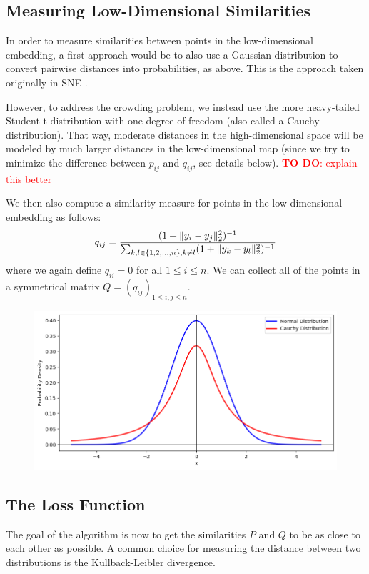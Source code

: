 \subsection{Measuring Low-Dimensional Similarities}
In order to measure similarities between points in the low-dimensional embedding, a first approach would be to also use a Gaussian distribution to convert pairwise distances into probabilities, as above. This is the approach taken originally in SNE \cite{Hinton02}.

However, to address the crowding problem, we instead use the more heavy-tailed Student t-distribution with one degree of freedom (also called a Cauchy distribution). That way, moderate distances in the high-dimensional space will be modeled by much larger distances in the low-dimensional map (since we try to minimize the difference between $p_{ij}$ and $q_{ij}$, see details below). 
\textcolor{red}{\textbf{TO DO}: explain this better}


We then also compute a similarity measure for points in the low-dimensional embedding as follows: 
\begin{equation}
    q_{ij} = \frac{(1+ \lVert y_i - y_j\rVert_2^2)^{-1}}{\sum_{k, l \in \{1,2, \dots, n\}, k \neq l} (1+\lVert y_k - y_l\rVert_2^2)^{-1}}
\end{equation}
where we again define $q_{ii} = 0$ for all $1 \leq i \leq n$. We can collect all of the points in a symmetrical matrix $Q = (q_{ij})_{1 \leq i, j \leq n}$. 


\begin{figure}[h]
    \begin{center}
        \includegraphics[width=0.9\linewidth]{figures/Gaussian_Cauchy.png}
    \end{center}
\end{figure}

\subsection{The Loss Function}
The goal of the algorithm is now to get the similarities $P$ and $Q$ to be as close to each other as possible. 
A common choice for measuring the distance between two distributions is the Kullback-Leibler divergence. 

